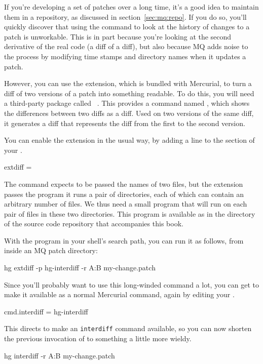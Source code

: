 If you're developing a set of patches over a long time, it's a good
idea to maintain them in a repository, as discussed in
section~\ref{sec:mq:repo}.  If you do so, you'll quickly discover that
using the  command to look at the history of changes to a
patch is unworkable.  This is in part because you're looking at the
second derivative of the real code (a diff of a diff), but also
because MQ adds noise to the process by modifying time stamps and
directory names when it updates a patch.

However, you can use the  extension, which is bundled
with Mercurial, to turn a diff of two versions of a patch into
something readable.  To do this, you will need a third-party package
called ~\cite{web:patchutils}.  This provides a
command named , which shows the differences between
two diffs as a diff.  Used on two versions of the same diff, it
generates a diff that represents the diff from the first to the second
version.

You can enable the  extension in the usual way, by
adding a line to the  section of your \hgrc.
\begin{codesample2}
  [extensions]
  extdiff =
\end{codesample2}
The  command expects to be passed the names of two
files, but the  extension passes the program it runs a
pair of directories, each of which can contain an arbitrary number of
files.  We thus need a small program that will run 
on each pair of files in these two directories.  This program is
available as  in the 
directory of the source code repository that accompanies this book.

With the  program in your shell's search path,
you can run it as follows, from inside an MQ patch directory:
\begin{codesample2}
  hg extdiff -p hg-interdiff -r A:B my-change.patch
\end{codesample2}
Since you'll probably want to use this long-winded command a lot, you
can get  to make it available as a normal Mercurial
command, again by editing your \hgrc.
\begin{codesample2}
  [extdiff]
  cmd.interdiff = hg-interdiff
\end{codesample2}
This directs  to make an \texttt{interdiff} command
available, so you can now shorten the previous invocation of
 to something a little more wieldy.
\begin{codesample2}
  hg interdiff -r A:B my-change.patch
\end{codesample2}

